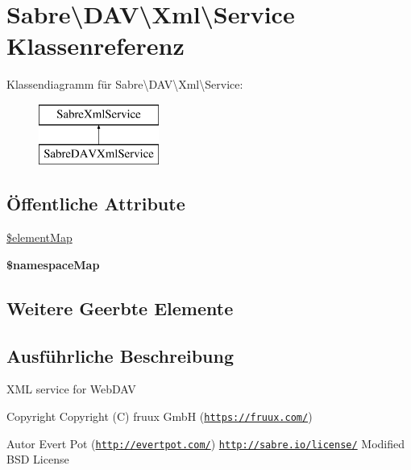 \hypertarget{class_sabre_1_1_d_a_v_1_1_xml_1_1_service}{}\section{Sabre\textbackslash{}D\+AV\textbackslash{}Xml\textbackslash{}Service Klassenreferenz}
\label{class_sabre_1_1_d_a_v_1_1_xml_1_1_service}
Klassendiagramm für Sabre\textbackslash{}D\+AV\textbackslash{}Xml\textbackslash{}Service\+:\begin{figure}[H]
\begin{center}
\leavevmode
\includegraphics[height=2.000000cm]{class_sabre_1_1_d_a_v_1_1_xml_1_1_service}
\end{center}
\end{figure}
\subsection*{Öffentliche Attribute}
\begin{DoxyCompactItemize}
\item 
\mbox{\hyperlink{class_sabre_1_1_d_a_v_1_1_xml_1_1_service_a970a42744ac1362de26bb2da90542961}{\$element\+Map}}
\item 
{\bfseries \$namespace\+Map}
\end{DoxyCompactItemize}
\subsection*{Weitere Geerbte Elemente}


\subsection{Ausführliche Beschreibung}
X\+ML service for Web\+D\+AV

\begin{DoxyCopyright}{Copyright}
Copyright (C) fruux GmbH (\href{https://fruux.com/}{\tt https\+://fruux.\+com/}) 
\end{DoxyCopyright}
\begin{DoxyAuthor}{Autor}
Evert Pot (\href{http://evertpot.com/}{\tt http\+://evertpot.\+com/})  \href{http://sabre.io/license/}{\tt http\+://sabre.\+io/license/} Modified B\+SD License 
\end{DoxyAuthor}


